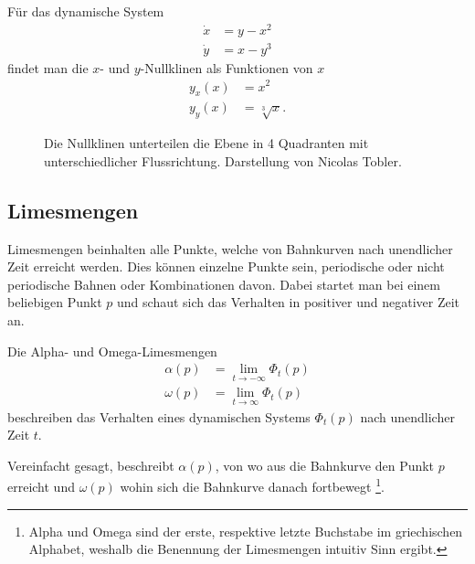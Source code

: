 \begin{beispiel} \label{poinbendix:beispiel:nullklinen}

Für das dynamische System
\begin{align*}
    \dot{x} &= y - x^2 \\
    \dot{y} &= x - y^3
\end{align*}
findet man die $x$- und $y$-Nullklinen als Funktionen von $x$
\begin{align*}
    y_x(x) &= x^2 \\
    y_y(x) &= \sqrt[3]{x}.
\end{align*}



\begin{figure}
    \centering
    \caption{Die Nullklinen unterteilen die Ebene in 4 Quadranten mit unterschiedlicher Flussrichtung. Darstellung von Nicolas Tobler.}
    \label{poinbendix:fig:nullklinen}
\end{figure}

\end{beispiel}

\subsection{Limesmengen} \label{poinbendix:subsection:limesmengen}

Limesmengen beinhalten alle Punkte, welche von Bahnkurven nach unendlicher Zeit erreicht werden.
Dies können einzelne Punkte sein, periodische oder nicht periodische Bahnen oder Kombinationen davon.
Dabei startet man bei einem beliebigen Punkt $p$ und schaut sich das Verhalten in positiver und negativer Zeit an.

\begin{definition}[Limesmengen]
Die Alpha- und Omega-Limesmengen
\label{poinbendix:def:limesmengen}
\begin{align*}
    \alpha(p) &= \lim_{t\to-\infty} \Phi_t(p) \\
    \omega(p) &= \lim_{t\to\infty} \Phi_t(p)
\end{align*}
beschreiben das Verhalten eines dynamischen Systems $\Phi_t(p)$ nach unendlicher Zeit $t$.
\end{definition}

Vereinfacht gesagt, beschreibt $\alpha(p)$, von wo aus die Bahnkurve den Punkt $p$ erreicht und $\omega(p)$ wohin sich die Bahnkurve danach fortbewegt
\footnote{Alpha und Omega sind der erste, respektive letzte Buchstabe im griechischen Alphabet, weshalb die Benennung der Limesmengen intuitiv Sinn ergibt.}.

